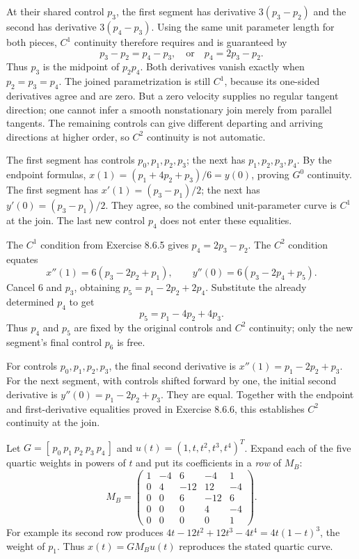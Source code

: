 At their shared control $p_3$, the first segment has derivative
$3(p_3-p_2)$ and the second has derivative $3(p_4-p_3)$.
Using the same unit parameter length for both pieces, $C^1$ continuity
therefore requires and is guaranteed by
\[
 p_3-p_2=p_4-p_3,\quad\text{or}\quad p_4=2p_3-p_2.
\]
Thus $p_3$ is the midpoint of $p_2p_4$.
Both derivatives vanish exactly when $p_2=p_3=p_4$.
The joined parametrization is still $C^1$, because its one-sided derivatives
agree and are zero. But a zero velocity supplies no regular tangent direction;
one cannot infer a smooth nonstationary join merely from parallel tangents.
The remaining controls can give different departing and arriving directions
at higher order, so $C^2$ continuity is not automatic.

The first segment has controls $p_0,p_1,p_2,p_3$; the next has
$p_1,p_2,p_3,p_4$.
By the endpoint formulas,
$x(1)=(p_1+4p_2+p_3)/6=y(0)$, proving $G^0$ continuity.
The first segment has $x'(1)=(p_3-p_1)/2$; the next has
$y'(0)=(p_3-p_1)/2$. They agree, so the combined unit-parameter
curve is $C^1$ at the join. The last new control $p_4$ does not enter
these equalities.

The $C^1$ condition from Exercise 8.6.5 gives $p_4=2p_3-p_2$.
The $C^2$ condition equates
\[
 x''(1)=6(p_3-2p_2+p_1),\qquad
 y''(0)=6(p_3-2p_4+p_5).
\]
Cancel $6$ and $p_3$, obtaining $p_5=p_1-2p_2+2p_4$.
Substitute the already determined $p_4$ to get
\[
 p_5=p_1-4p_2+4p_3.
\]
Thus $p_4$ and $p_5$ are fixed by the original controls and $C^2$
continuity; only the new segment's final control $p_6$ is free.

For controls $p_0,p_1,p_2,p_3$, the final second derivative is
$x''(1)=p_1-2p_2+p_3$.
For the next segment, with controls shifted forward by one,
the initial second derivative is $y''(0)=p_1-2p_2+p_3$.
They are equal. Together with the endpoint and first-derivative equalities
proved in Exercise 8.6.6, this establishes $C^2$ continuity at the join.

Let $G=[\,p_0\ p_1\ p_2\ p_3\ p_4\,]$ and
$u(t)=(1,t,t^2,t^3,t^4)^T$. Expand each of the five quartic weights in
powers of $t$ and put its coefficients in a \emph{row} of $M_B$:
\[
 M_B=\begin{pmatrix}
 1&-4&6&-4&1\\0&4&-12&12&-4\\0&0&6&-12&6\\
 0&0&0&4&-4\\0&0&0&0&1
 \end{pmatrix}.
\]
For example its second row produces
$4t-12t^2+12t^3-4t^4=4t(1-t)^3$, the weight of $p_1$.
Thus $x(t)=GM_Bu(t)$ reproduces the stated quartic curve.

